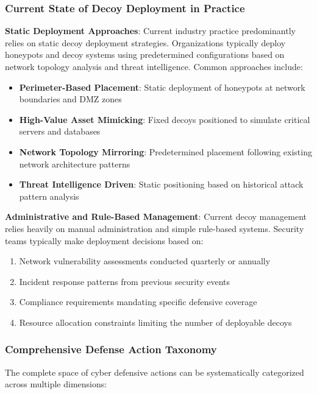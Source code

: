 \documentclass[12pt,oneside]{article}
\begin{document}
\subsubsection{Current State of Decoy Deployment in Practice}

\textbf{Static Deployment Approaches}: Current industry practice predominantly relies on static decoy deployment strategies. Organizations typically deploy honeypots and decoy systems using predetermined configurations based on network topology analysis and threat intelligence. Common approaches include:

\begin{itemize}
\item \textbf{Perimeter-Based Placement}: Static deployment of honeypots at network boundaries and DMZ zones
\item \textbf{High-Value Asset Mimicking}: Fixed decoys positioned to simulate critical servers and databases  
\item \textbf{Network Topology Mirroring}: Predetermined placement following existing network architecture patterns
\item \textbf{Threat Intelligence Driven}: Static positioning based on historical attack pattern analysis
\end{itemize}

\textbf{Administrative and Rule-Based Management}: Current decoy management relies heavily on manual administration and simple rule-based systems. Security teams typically make deployment decisions based on:

\begin{enumerate}
\item Network vulnerability assessments conducted quarterly or annually
\item Incident response patterns from previous security events
\item Compliance requirements mandating specific defensive coverage
\item Resource allocation constraints limiting the number of deployable decoys
\end{enumerate}

\subsubsection{Comprehensive Defense Action Taxonomy}

The complete space of cyber defensive actions can be systematically categorized across multiple dimensions:
\end{document}
